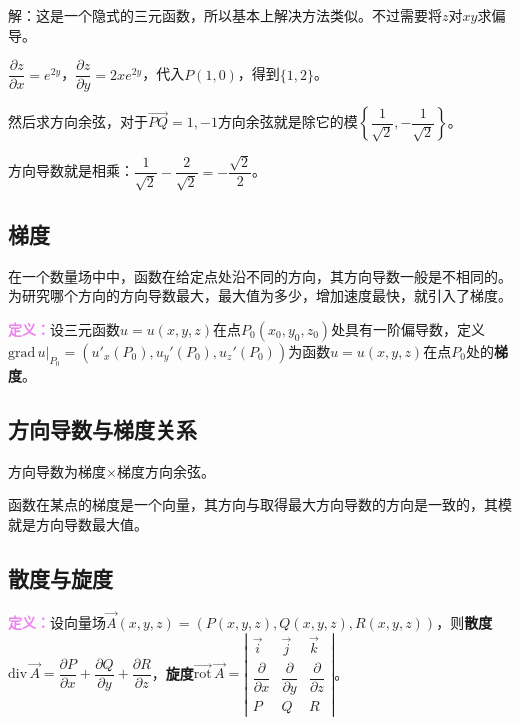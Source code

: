 \documentclass[UTF8, 12pt]{ctexart}
\begin{document}
解：这是一个隐式的三元函数，所以基本上解决方法类似。不过需要将$z$对$xy$求偏导。

$\dfrac{\partial z}{\partial x}=e^{2y}$，$\dfrac{\partial z}{\partial y}=2xe^{2y}$，代入$P(1,0)$，得到$\{1,2\}$。

然后求方向余弦，对于$\overrightarrow{PQ}={1,-1}$方向余弦就是除它的模$\left\{\dfrac{1}{\sqrt{2}},-\dfrac{1}{\sqrt{2}}\right\}$。

方向导数就是相乘：$\dfrac{1}{\sqrt{2}}-\dfrac{2}{\sqrt{2}}=-\dfrac{\sqrt{2}}{2}$。

\subsection{梯度}

在一个数量场中中，函数在给定点处沿不同的方向，其方向导数一般是不相同的。为研究哪个方向的方向导数最大，最大值为多少，增加速度最快，就引入了梯度。

\textcolor{violet}{\textbf{定义：}}设三元函数$u=u(x,y,z)$在点$P_0(x_0,y_0,z_0)$处具有一阶偏导数，定义$\text{grad}\,u|_{P_0}=(u'_x(P_0),u_y'(P_0),u_z'(P_0))$为函数$u=u(x,y,z)$在点$P_0$处的\textbf{梯度}。

\subsection{方向导数与梯度关系}

方向导数为梯度×梯度方向余弦。

函数在某点的梯度是一个向量，其方向与取得最大方向导数的方向是一致的，其模就是方向导数最大值。

\subsection{散度与旋度}

\textcolor{violet}{\textbf{定义：}}设向量场$\vec{A}(x,y,z)=(P(x,y,z),Q(x,y,z),R(x,y,z))$，则\textbf{散度}$\textrm{div}\,\vec{A}=\dfrac{\partial P}{\partial x}+\dfrac{\partial Q}{\partial y}+\dfrac{\partial R}{\partial z}$，\textbf{旋度}$\overrightarrow{\textrm{rot}}\,\vec{A}=\left\vert\begin{array}{ccc}
    \vec{i} & \vec{j} & \vec{k} \\
    \dfrac{\partial}{\partial x} & \dfrac{\partial}{\partial y} & \dfrac{\partial}{\partial z} \\
    P & Q & R
\end{array}\right\vert$。
\end{document}
